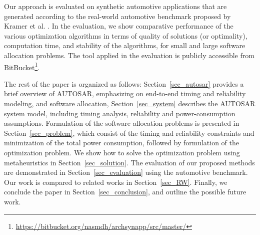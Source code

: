 Our approach is evaluated on synthetic automotive applications that are generated according to the real-world automotive benchmark proposed by Kramer et al. \cite{Kramer2015RealFree}. In the evaluation, we show comparative performance of the various optimization algorithms in terms of quality of solutions (or optimality), computation time,  and stability of the algorithms, for small and large software allocation problems. The tool applied in the evaluation is publicly accessible from BitBucket\footnote{\url{https://bitbucket.org/nasmdh/archsynapp/src/master/}}. 

The rest of the paper is organized as follows:
Section~\ref{sec_autosar} provides a brief overview of AUTOSAR, emphasizing on end-to-end timing and reliability modeling, and software allocation,
Section~\ref{sec_system} describes the AUTOSAR system model, including timing analysis, reliability and power-consumption assumptions.
Formulation of the software allocation problems is presented in Section~\ref{sec_problem}, which consist of the timing and reliability constraints and minimization of the total power consumption, followed by formulation of the optimization problem. 
We show how to solve the optimization problem using metaheuristics in Section~\ref{sec_solution}. The evaluation of our proposed methods are demonstrated in Section~\ref{sec_evaluation} using the automotive benchmark. Our work is compared to related works in Section~\ref{sec_RW}. Finally, we conclude the paper in Section~\ref{sec_conclusion}, and outline the possible future work.


